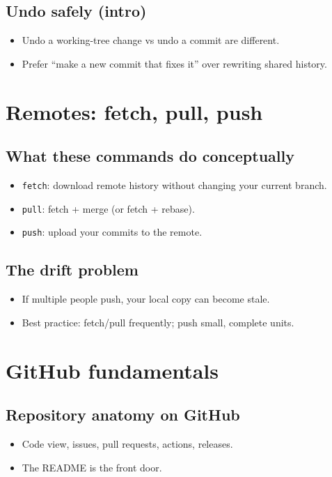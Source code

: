 \subsection{Undo safely (intro)}
\begin{itemize}
\item Undo a working-tree change vs undo a commit are different.
\item Prefer ``make a new commit that fixes it'' over rewriting shared history.
\end{itemize}

\section{Remotes: fetch, pull, push}
\subsection{What these commands do conceptually}
\begin{itemize}
\item \texttt{fetch}: download remote history without changing your current branch.
\item \texttt{pull}: fetch + merge (or fetch + rebase).
\item \texttt{push}: upload your commits to the remote.
\end{itemize}

\subsection{The drift problem}
\begin{itemize}
\item If multiple people push, your local copy can become stale.
\item Best practice: fetch/pull frequently; push small, complete units.
\end{itemize}

\section{GitHub fundamentals}
\subsection{Repository anatomy on GitHub}
\begin{itemize}
\item Code view, issues, pull requests, actions, releases.
\item The README is the front door.
\end{itemize}

